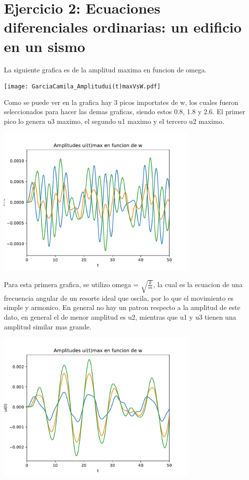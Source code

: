 \documentclass[11pt,letterpaper]{exam}
\begin{document}
\section{Ejercicio 2: Ecuaciones diferenciales ordinarias: un edificio en un sismo}

La siguiente grafica es de la amplitud maxima en funcion de omega. 
\begin{center}
\texttt{[image: GarciaCamila\_Amplitudui(t)maxVsW.pdf]}
\end{center}

Como se puede ver en la grafica hay 3 picos importates de w, los cuales fueron seleccionados para hacer las demas graficas, siendo estos 0.8, 1.8 y 2.6. El primer pico lo genera u3 maximo, el segundo u1 maximo y el tercero u2 maximo.

\begin{center}
\includegraphics[width=10cm]{PrimeraGraficaUi(t).pdf}
\end{center}

Para esta primera grafica, se utilizo omega = $\sqrt{\frac{k}{m}}$, la cual es la ecuacion de una frecuencia angular de un resorte ideal que oscila, por lo que el movimiento es simple y armonico. En general no hay un patron respecto a la amplitud de este dato, en general el de menor amplitud es u2, mientras que u1 y u3 tienen una amplitud similar mas grande.

\begin{center}
\includegraphics[width=10cm]{SegundaGraficaUi(t).pdf}
\end{center}
\end{document}
